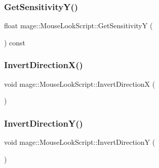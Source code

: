 \subsubsection{\texorpdfstring{Get\+Sensitivity\+Y()}{GetSensitivityY()}}
{\footnotesize\ttfamily float mage\+::\+Mouse\+Look\+Script\+::\+Get\+SensitivityY (\begin{DoxyParamCaption}{ }\end{DoxyParamCaption}) const\hspace{0.3cm}{\ttfamily [noexcept]}}

\hypertarget{classmage_1_1_mouse_look_script_a2f1fa6a912e9ee8720c51d7b03df39a1}{}\label{classmage_1_1_mouse_look_script_a2f1fa6a912e9ee8720c51d7b03df39a1} 
\subsubsection{\texorpdfstring{Invert\+Direction\+X()}{InvertDirectionX()}}
{\footnotesize\ttfamily void mage\+::\+Mouse\+Look\+Script\+::\+Invert\+DirectionX (\begin{DoxyParamCaption}{ }\end{DoxyParamCaption})\hspace{0.3cm}{\ttfamily [noexcept]}}

\hypertarget{classmage_1_1_mouse_look_script_a773f4e2ab6eac735e920db427d82e634}{}\label{classmage_1_1_mouse_look_script_a773f4e2ab6eac735e920db427d82e634} 
\subsubsection{\texorpdfstring{Invert\+Direction\+Y()}{InvertDirectionY()}}
{\footnotesize\ttfamily void mage\+::\+Mouse\+Look\+Script\+::\+Invert\+DirectionY (\begin{DoxyParamCaption}{ }\end{DoxyParamCaption})\hspace{0.3cm}{\ttfamily [noexcept]}}

\hypertarget{classmage_1_1_mouse_look_script_a13fba7e90bf10d24814e0a8cec25645e}{}\label{classmage_1_1_mouse_look_script_a13fba7e90bf10d24814e0a8cec25645e} 
